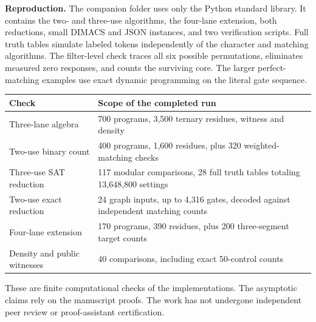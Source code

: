 \documentclass[11pt,letterpaper]{article}
\newcommand{\lab}[1]{\textbf{\color{navy}#1}\enspace}
\begin{document}
\lab{Reproduction.} The companion folder uses only the Python standard library. It contains the two- and three-use algorithms, the four-lane extension, both reductions, small DIMACS and JSON instances, and two verification scripts. Full truth tables simulate labeled tokens independently of the character and matching algorithms. The filter-level check traces all six possible permutations, eliminates measured zero responses, and counts the surviving core. The larger perfect-matching examples use exact dynamic programming on the literal gate sequence.
\begin{center}\small\renewcommand{\arraystretch}{1.12}
\begin{tabular}{@{}p{.46\linewidth}p{.46\linewidth}@{}}\toprule
Check & Scope of the completed run\\\midrule
Three-lane algebra & 700 programs, 3,500 ternary residues, witness and density\\
Two-use binary count & 400 programs, 1,600 residues, plus 320 weighted-matching checks\\
Three-use SAT reduction & 117 modular comparisons, 28 full truth tables totaling 13,648,800 settings\\
Two-use exact reduction & 24 graph inputs, up to 4,316 gates, decoded against independent matching counts\\
Four-lane extension & 170 programs, 390 residues, plus 200 three-segment target counts\\
Density and public witnesses & 40 comparisons, including exact 50-control counts\\\bottomrule
\end{tabular}\end{center}
{\small These are finite computational checks of the implementations. The asymptotic claims rely on the manuscript proofs. The work has not undergone independent peer review or proof-assistant certification.}
\end{document}
